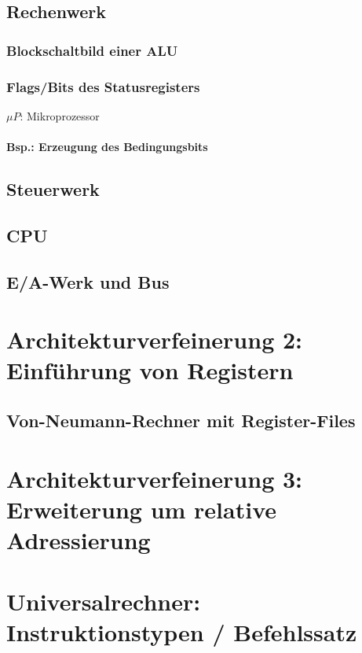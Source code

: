 \subsection{Rechenwerk}
\subsubsection{Blockschaltbild einer ALU}
\subsubsection{Flags/Bits des Statusregisters}
$\mu P$: Mikroprozessor
\paragraph{Bsp.: Erzeugung des Bedingungsbits}
\subsection{Steuerwerk}
\subsection{CPU}
\subsection{E/A-Werk und Bus}

\section{Architekturverfeinerung 2: Einführung von Registern}

\subsection{Von-Neumann-Rechner mit Register-Files}

\section{Architekturverfeinerung 3: Erweiterung um relative Adressierung}

\section{Universalrechner: Instruktionstypen / Befehlssatz}


